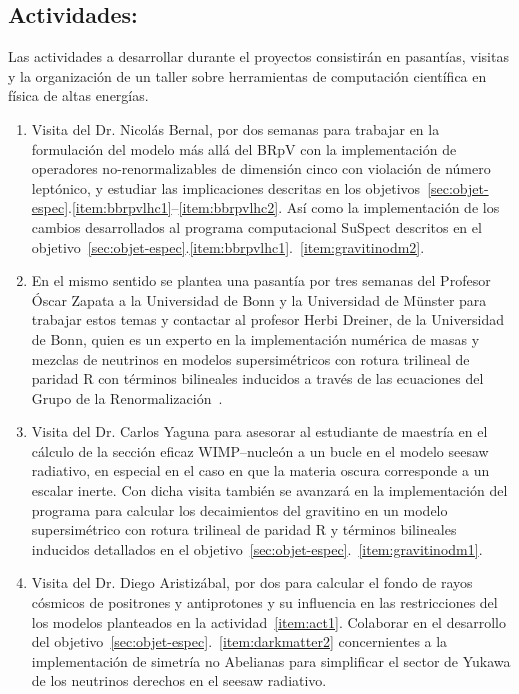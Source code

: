\subsection{Actividades:                                   }
\label{sec:actividades}
Las actividades a desarrollar durante el proyectos consistirán en
pasantías, visitas y la organización de un taller sobre herramientas de
computación científica en física de altas energías.

\begin{enumerate}
\item Visita del Dr. Nicolás Bernal, por dos semanas para trabajar en
  la formulación del modelo más allá del BRpV con la implementación de
  operadores no-renormalizables de dimensión cinco con violación de
  número leptónico, y estudiar las implicaciones descritas en los
  objetivos~\ref{sec:objet-espec}.\ref{item:bbrpvlhc1}--\ref{item:bbrpvlhc2}. Así
  como la implementación de los cambios desarrollados al programa
  computacional SuSpect descritos en el
  objetivo~\ref{sec:objet-espec}.\ref{item:bbrpvlhc1}.~\ref{item:gravitinodm2}. 
  \label{item:act1}

\item En el mismo sentido se plantea una pasantía por tres semanas del
  Profesor Óscar Zapata a la Universidad de Bonn y la Universidad de
  Münster para trabajar estos temas y contactar al profesor Herbi
  Dreiner, de la Universidad de Bonn, quien es un experto en la
  implementación numérica de masas y mezclas de neutrinos en modelos
  supersimétricos con rotura trilineal de paridad R con términos
  bilineales inducidos a través de las ecuaciones del Grupo de la
  Renormalización~\cite{Dreiner:2011ft}.
  \label{item:act2}
\item Visita del Dr. Carlos Yaguna para asesorar al estudiante de
  maestría en el cálculo de la sección eficaz WIMP--nucleón a un bucle
  en el modelo seesaw radiativo, en especial en el caso en que la
  materia oscura corresponde a un escalar inerte. Con dicha visita
  también se avanzará en la implementación del programa para calcular
  los decaimientos del gravitino en un modelo supersimétrico con
  rotura trilineal de paridad R y términos bilineales inducidos
  detallados en el
  objetivo~\ref{sec:objet-espec}.~\ref{item:gravitinodm1}.
  \label{item:act3}

\item Visita del Dr. Diego Aristizábal, por dos para  calcular el
  fondo de rayos cósmicos de positrones y antiprotones y  su
  influencia en las restricciones del los modelos planteados en la
  actividad~\ref{item:act1}. Colaborar en el desarrollo del
  objetivo~\ref{sec:objet-espec}.~\ref{item:darkmatter2} concernientes
  a la implementación de simetría no Abelianas para simplificar el
  sector de Yukawa de los neutrinos derechos en el seesaw radiativo.
  \label{item:act4}


\end{enumerate}

